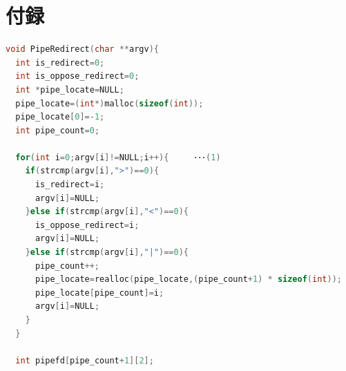 \documentclass[a4j, twocolumn]{ltjsarticle}
\renewcommand{\lstlistingname}{ソースコード}
\begin{document}
  \renewcommand{\thelstlisting}{\arabic{lstlisting}}  %
  \setcounter{lstlisting}{0}  %
      \newpage
  \section*{付録}
  \renewcommand{\lstlistingname}{付録}
  \begin{lstlisting}[language=C,caption=パイプリダイレクト関数]
void PipeRedirect(char **argv){
  int is_redirect=0;
  int is_oppose_redirect=0;
  int *pipe_locate=NULL;
  pipe_locate=(int*)malloc(sizeof(int));
  pipe_locate[0]=-1;
  int pipe_count=0;
  
  for(int i=0;argv[i]!=NULL;i++){     ･･･(1)
    if(strcmp(argv[i],">")==0){
      is_redirect=i;
      argv[i]=NULL;
    }else if(strcmp(argv[i],"<")==0){
      is_oppose_redirect=i;
      argv[i]=NULL;
    }else if(strcmp(argv[i],"|")==0){
      pipe_count++;
      pipe_locate=realloc(pipe_locate,(pipe_count+1) * sizeof(int));
      pipe_locate[pipe_count]=i;
      argv[i]=NULL;
    }
  }

  int pipefd[pipe_count+1][2];


\end{lstlisting}
\end{document}
